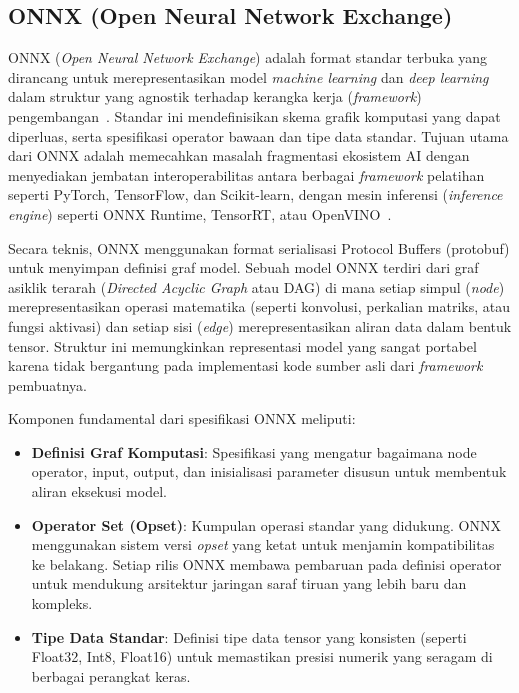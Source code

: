 \subsection{ONNX (Open Neural Network Exchange)}
ONNX (\textit{Open Neural Network Exchange}) adalah format standar terbuka
yang dirancang untuk merepresentasikan model \textit{machine learning} dan
\textit{deep learning} dalam struktur yang agnostik terhadap kerangka kerja
(\textit{framework}) pengembangan~\cite{Lin2019ONNC, Tian2020Compiling}.
Standar ini mendefinisikan skema grafik komputasi yang dapat diperluas,
serta spesifikasi operator bawaan dan tipe data standar. Tujuan utama dari
ONNX adalah memecahkan masalah fragmentasi ekosistem AI dengan
menyediakan jembatan interoperabilitas antara berbagai \textit{framework}
pelatihan seperti PyTorch, TensorFlow, dan Scikit-learn, dengan mesin
inferensi (\textit{inference engine}) seperti ONNX Runtime, TensorRT, atau
OpenVINO~\cite{Jajal2024Interoperability, Sever2021A}.

Secara teknis, ONNX menggunakan format serialisasi Protocol Buffers
(protobuf) untuk menyimpan definisi graf model. Sebuah model ONNX terdiri
dari graf asiklik terarah (\textit{Directed Acyclic Graph} atau DAG) di mana
setiap simpul (\textit{node}) merepresentasikan operasi matematika
(seperti konvolusi, perkalian matriks, atau fungsi aktivasi) dan setiap sisi
(\textit{edge}) merepresentasikan aliran data dalam bentuk tensor. Struktur
ini memungkinkan representasi model yang sangat portabel karena tidak
bergantung pada implementasi kode sumber asli dari \textit{framework}
pembuatnya.

Komponen fundamental dari spesifikasi ONNX meliputi:
\begin{itemize}
  \item \textbf{Definisi Graf Komputasi}: Spesifikasi yang mengatur
    bagaimana node operator, input, output, dan inisialisasi parameter
    disusun untuk membentuk aliran eksekusi model.
  \item \textbf{Operator Set (Opset)}: Kumpulan operasi standar yang
    didukung. ONNX menggunakan sistem versi \textit{opset} yang ketat
    untuk menjamin kompatibilitas ke belakang. Setiap rilis ONNX membawa
    pembaruan pada definisi operator untuk mendukung arsitektur jaringan
    saraf tiruan yang lebih baru dan kompleks.
  \item \textbf{Tipe Data Standar}: Definisi tipe data tensor yang
    konsisten (seperti Float32, Int8, Float16) untuk memastikan presisi
    numerik yang seragam di berbagai perangkat keras.
\end{itemize}

